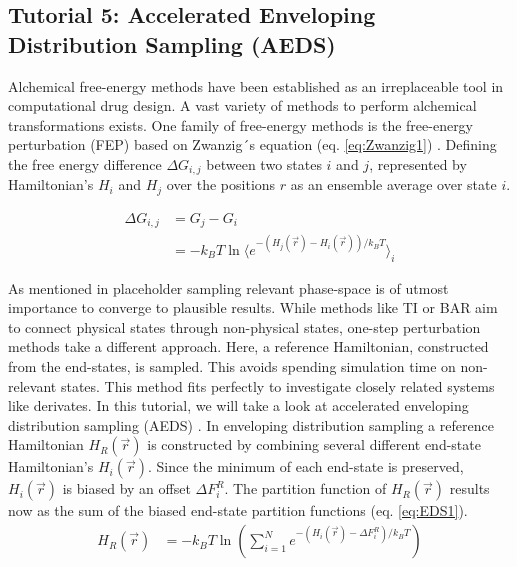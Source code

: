 
\subsection{Tutorial 5: Accelerated Enveloping Distribution Sampling (AEDS)}

Alchemical free-energy methods have been established as an irreplaceable tool in computational drug design. A vast variety of methods to perform alchemical transformations exists. One family of free-energy methods is the free-energy perturbation (FEP) based on Zwanzig´s equation (eq. \ref{eq:Zwanzig1}) \cite{Zwanzig1954}. Defining the free energy difference $\Delta G_{i,j}$ between two states $i$ and $j$, represented by Hamiltonian's $H_i$ and $H_j$ over the positions $r$ as an ensemble average over state $i$. 

\begin{equation}
\begin{aligned}
\Delta G_{i,j} & = G_j - G_i \\ & = -k_BT \ln  \Biggl \langle e^{ -(H_j(\vec{r}) - H_i(\vec{r}))/k_BT} \biggr \rangle_i 
\end{aligned}
\label{eq:Zwanzig1}
\end{equation}

As mentioned in placeholder sampling relevant phase-space is of utmost importance to converge to plausible results. While methods like TI\cite{kirkwood_TI} or BAR\cite{bar} aim to connect physical states through non-physical states, one-step perturbation methods take a different approach. Here, a reference Hamiltonian, constructed from the end-states, is sampled. This avoids spending simulation time on non-relevant states. This method fits perfectly to investigate closely related systems like derivates. In this tutorial, we will take a look at accelerated enveloping distribution sampling (AEDS) \cite{JP2018,JP2020}. In enveloping distribution sampling a reference Hamiltonian $H_R(\vec{r})$ is constructed by combining several different end-state Hamiltonian's $H_i(\vec{r})$. Since the minimum of each end-state is preserved, $H_i(\vec{r})$ is biased by an offset $\Delta F_{i}^R$. The partition function of $H_R(\vec{r})$ results now as the sum of the biased end-state partition functions (eq. \ref{eq:EDS1}).
\begin{equation}
\begin{aligned}
H_R(\vec{r}) & = -k_BT \ln  \left( \sum_{i=1}^{N} e^{ -(H_i(\vec{r}) - \Delta F_{i}^R)/k_BT} \right) 
\end{aligned}
\label{eq:EDS1}
\end{equation}

